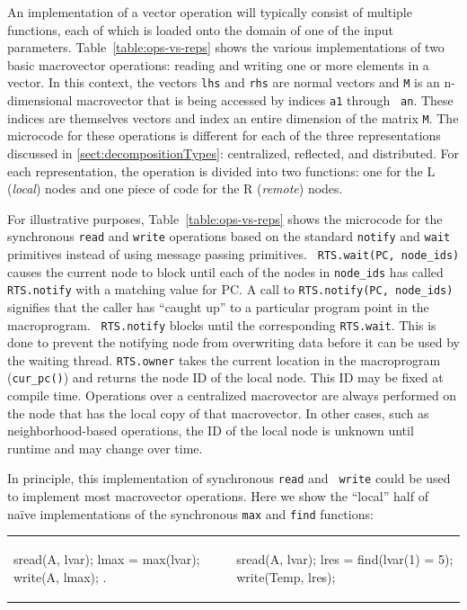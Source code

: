 An implementation of a vector operation will typically consist of
multiple functions, each of which is loaded onto the domain of one of
the input parameters.  Table~\ref{table:ops-vs-reps}
shows the various implementations of two basic macrovector operations: reading and writing one or
more elements in a vector. In this context, the vectors {\tt lhs} and
{\tt rhs} are normal vectors and {\tt M} is an n-dimensional
macrovector that is being accessed by indices {\tt a1} through {\tt
  an}.  These indices are themselves vectors and index an entire
dimension of the matrix {\tt M}.  The microcode for these operations
is different for each of the three representations discussed in
\ref{sect:decompositionTypes}: centralized, reflected, and
distributed.  For each representation, the operation is divided into
two functions: one for the L (\emph{local}) nodes and one piece of
code for the R (\emph{remote}) nodes.

For illustrative purposes, Table~\ref{table:ops-vs-reps} shows the microcode for
the  synchronous {\tt read} and {\tt write} operations based on the standard {\tt notify}
and {\tt wait} primitives instead of using message passing primitives.  {\tt
RTS.wait(PC, node\_ids)} causes the current node to block until each of the
nodes in {\tt node\_ids} has called {\tt RTS.notify} with a matching value for
PC. A call to {\tt RTS.notify(PC, node\_ids)} signifies that the caller has
``caught up'' to a particular program point in the macroprogram. {\tt
RTS.notify} blocks until the corresponding {\tt RTS.wait}. This is done to
prevent the notifying node from overwriting data before it can be used by the
waiting thread.  {\tt RTS.owner} takes the current location in the macroprogram
({\tt cur\_pc()}) and returns the node ID of the local node. This ID may be
fixed at compile time. Operations over a centralized macrovector
are always performed on the node that has the local copy of that macrovector. In
other cases, such as neighborhood-based operations, the ID of the local node is
unknown until runtime and may change over time.

In principle, this implementation of synchronous {\tt read} and {\tt
  write} could be used to implement most macrovector operations.
Here we show the ``local'' half of na\"{i}ve implementations
of the synchronous {\tt max} and {\tt find} functions:

\begin{tabular}{l|ll}
{\begin{macrolab}
sread(A, lvar);
lmax = max(lvar);
write(A, lmax);
.
\end{macrolab}}
& ~ &
{\begin{macrolab}
sread(A, lvar); 
lres =
  find(lvar(1) = 5); 
write(Temp, lres);
\end{macrolab}}
\end{tabular}

